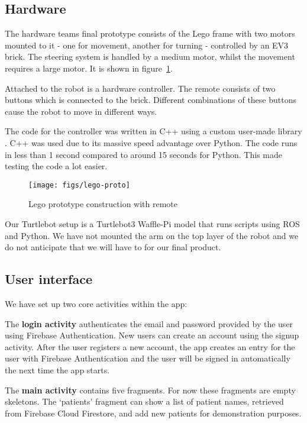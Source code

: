 \documentclass{article}
\begin{document}
\subsection{Hardware}

The hardware teams final prototype consists of the Lego frame with two motors mounted to it - one for movement, another for turning - controlled by an EV3 brick. The steering system is handled by a medium motor, whilst the movement requires a large motor. It is shown in figure~\ref{fig:lego-proto}.

Attached to the robot is a hardware controller. The remote consists of two buttons which is connected to the brick. Different combinations of these buttons cause the robot to move in different ways.

The code for the controller was written in C++ using a custom user-made library \cite{cpp}. C++ was used due to its massive speed advantage over Python. The code runs in less than 1 second compared to around 15 seconds for Python. This made testing the code a lot easier.

\begin{figure}[tb]
\vskip 5mm
\begin{center}
\centerline{\texttt{[image: figs/lego-proto]}}
\caption{Lego prototype construction with remote}
\label{fig:lego-proto}
\end{center}
\vskip -5mm
\end{figure}

Our Turtlebot setup is a Turtlebot3 Waffle-Pi model that runs scripts using ROS and Python. We have not mounted the arm on the top layer of the robot and we do not anticipate that we will have to for our final product. 

\subsection{User interface}
We have set up two core activities within the app:

The {\bf login activity} authenticates the email and password provided by the user using Firebase Authentication. New users can create an account using the signup activity. After the user registers a new account, the app creates an entry for the user with Firebase Authentication and the user will be signed in automatically the next time the app starts.

The {\bf main activity} contains five fragments. For now these fragments are empty skeletons. The `patients' fragment can show a list of patient names, retrieved from Firebase Cloud Firestore, and add new patients for demonstration purposes.
\end{document}
